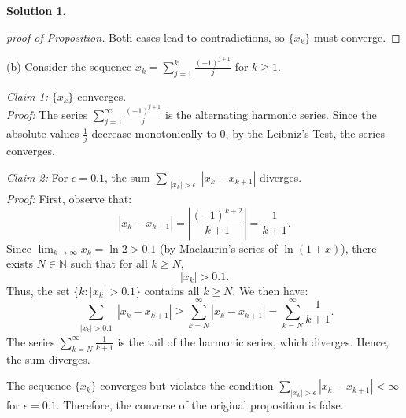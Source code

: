 \documentclass[12pt]{article}
\theoremstyle{definition}
\newtheorem*{solution}{\normalfont\textbf{Solution}}
\begin{document}
\begin{enumerate}[leftmargin=*]
\begin{solution}
\begin{proof}[proof of Proposition]
                    Both cases lead to contradictions, so \(\{x_k\}\) must converge.
                \end{proof}

            \item[(b)]
                Consider the sequence \(x_k = \sum_{j=1}^k \frac{(-1)^{j+1}}{j}\) for \(k \geq 1\). 

                \noindent \textit{Claim 1:} \(\{x_k\}\) converges. \\
                \textit{Proof:} The series \(\sum_{j=1}^\infty \frac{(-1)^{j+1}}{j}\) is the alternating harmonic series. Since the absolute values \(\frac{1}{j}\) decrease monotonically to \(0\), by the  Leibniz's Test, the series converges.

                \noindent \textit{Claim 2:} For \(\epsilon = 0.1\), the sum \(\sum_{\substack{|x_k| > \epsilon}} |x_k - x_{k+1}|\) diverges. \\
                \textit{Proof:} First, observe that:
                \[
                |x_k - x_{k+1}| = \left| \frac{(-1)^{k+2}}{k+1} \right| = \frac{1}{k+1}.
                \]
                Since \(\lim_{k \to \infty} x_k = \ln 2 > 0.1\) (by Maclaurin's series of \(\ln(1+x)\)), there exists \(N \in \mathbb{N}\) such that for all \(k \geq N\), 
                \[
                |x_k| > 0.1.
                \]
                Thus, the set \(\{k : |x_k| > 0.1\}\) contains all \(k \geq N\). We then have:
                \[
                \sum_{\substack{ |x_k| > 0.1}} |x_k - x_{k+1}| \geq \sum_{k=N}^{\infty} |x_k - x_{k+1}| = \sum_{k=N}^{\infty} \frac{1}{k+1}.
                \]
                The series \(\sum_{k=N}^{\infty} \frac{1}{k+1}\) is the tail of the harmonic series, which diverges. Hence, the sum diverges.

                The sequence \(\{x_k\}\) converges but violates the condition \(\sum_{|x_k| > \epsilon} |x_k - x_{k+1}| < \infty\) for \(\epsilon = 0.1\). Therefore, the converse of the original proposition is false.
    \end{solution}


\end{enumerate}
\end{document}
